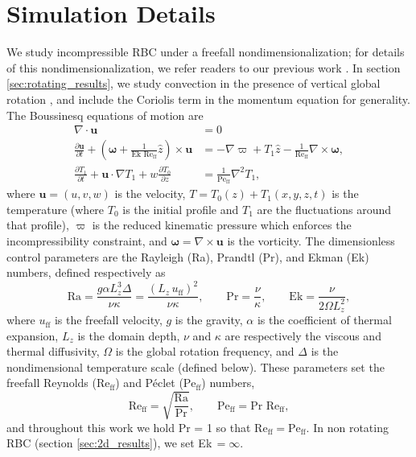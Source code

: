 \documentclass[aps, pre, onecolumn, nofootinbib, notitlepage, groupedaddress, amsfonts, amssymb, amsmath, longbibliography, superscriptaddress]{revtex4-1}
\newcommand{\DivU}{\ensuremath{\nabla\cdot\bm{u}}}
\newcommand{\grad}{\ensuremath{\nabla}}
\newcommand{\Reff}{\ensuremath{\text{Re}_{\text{ff}}}}
\newcommand{\Peff}{\ensuremath{\text{Pe}_{\text{ff}}}}
\begin{document}

\section{Simulation Details}
\label{sec:simulations}
We study incompressible RBC under a freefall nondimensionalization; for details of this nondimensionalization, we refer readers to our previous work \cite{anders&all2018}.
In section \ref{sec:rotating_results}, we study convection in the presence of vertical global rotation \cite{julien&all1996}, and include the Coriolis term in the momentum equation for generality.
The Boussinesq equations of motion are
\begin{align}
\DivU &= 0
	\label{eqn:incompressible}
\\
\frac{\partial \bm{u}}{\partial t} + \left(\bm{\omega} + \frac{1}{\text{Ek }\Reff}\hat{z}\right)\times\bm{u} 
&= - \grad \varpi + T_1\hat{z} - \frac{1}{\Reff}\grad\times\bm{\omega},
	\label{eqn:bouss_momentum}
\\
\frac{\partial T_1}{\partial t}  + \bm{u}\cdot\grad T_1 + w \frac{\partial T_0}{\partial z} 
&= \frac{1}{\Peff}\grad^2 T_1,
	\label{eqn:bouss_energy}
\end{align}
where $\bm{u} = (u, v, w)$ is the velocity, $T = T_0(z) + T_1(x, y, z, t)$ is the temperature (where $T_0$ is the initial profile and $T_1$ are the fluctuations around that profile), $\varpi$ is the reduced kinematic pressure \cite{anders&all2018} which enforces the incompressibility constraint, and $\bm{\omega} = \grad \times \bm{u}$ is the vorticity.
The dimensionless control parameters are the Rayleigh (Ra), Prandtl (Pr), and Ekman (Ek) numbers, defined respectively as
\begin{equation}
\text{Ra} = \frac{g \alpha L_z^3 \Delta}{\nu\kappa} = \frac{(L_z\,u_{\text{ff}})^2}{\nu\kappa}, \qquad \text{Pr} = \frac{\nu}{\kappa}, \qquad \text{Ek} = \frac{\nu}{2\Omega L_z^2},
\end{equation}
where $u_{\text{ff}}$ is the freefall velocity, $g$ is the gravity, $\alpha$ is the coefficient of thermal expansion, $L_z$ is the domain depth, $\nu$ and $\kappa$ are respectively the viscous and thermal diffusivity, $\Omega$ is the global rotation frequency, and $\Delta$ is the nondimensional temperature scale (defined below).
These parameters set the freefall Reynolds (\Reff) and P\'{e}clet (\Peff) numbers, 
\begin{equation}
\Reff = \sqrt{\frac{\text{Ra}}{\text{Pr}}},\qquad
\Peff = \text{Pr }\Reff,
\end{equation}
and throughout this work we hold Pr = 1 so that $\Reff = \Peff$.
In non rotating RBC (section \ref{sec:2d_results}), we set Ek$\,= \infty$.
\end{document}
